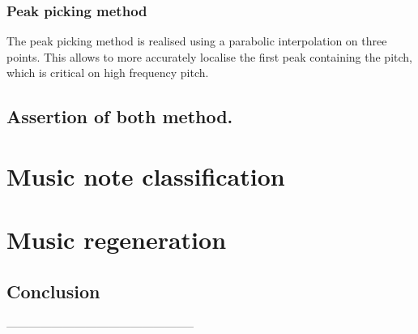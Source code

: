 \documentclass[twoside,twocolumn]{report}
\begin{document}
\subsection{Peak picking method}
The peak picking method is realised using a parabolic interpolation on three points. This allows to more accurately localise the first peak containing the pitch, which is critical on high frequency pitch.

\section{Assertion of both method.}
\chapter{Music note classification}

\chapter{Music regeneration }
\section{Conclusion}

\begin{thebibliography}{99} %





 
\end{thebibliography}--------------------------------------------------



\end{document}
